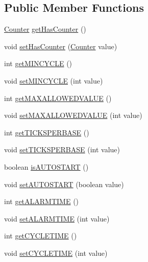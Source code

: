 \subsection*{Public Member Functions}
\begin{DoxyCompactItemize}
\item 
\hyperlink{interfaceshootingmachineemfmodel_1_1_counter}{Counter} \hyperlink{interfaceshootingmachineemfmodel_1_1_alarm_a442e899482a13941a48d3921b5892265}{get\-Has\-Counter} ()
\item 
void \hyperlink{interfaceshootingmachineemfmodel_1_1_alarm_a3314858d4d4a081da9b50bf279d7851f}{set\-Has\-Counter} (\hyperlink{interfaceshootingmachineemfmodel_1_1_counter}{Counter} value)
\item 
int \hyperlink{interfaceshootingmachineemfmodel_1_1_alarm_a0fbebe94ea5a08f4ad9bace4563bd149}{get\-M\-I\-N\-C\-Y\-C\-L\-E} ()
\item 
void \hyperlink{interfaceshootingmachineemfmodel_1_1_alarm_a7400566a915b403ceb7219ccd4a40f7c}{set\-M\-I\-N\-C\-Y\-C\-L\-E} (int value)
\item 
int \hyperlink{interfaceshootingmachineemfmodel_1_1_alarm_a63e36037c1877c380b5494f1a05dce5e}{get\-M\-A\-X\-A\-L\-L\-O\-W\-E\-D\-V\-A\-L\-U\-E} ()
\item 
void \hyperlink{interfaceshootingmachineemfmodel_1_1_alarm_aae7bb6babb30269f5a6e7c74db2a0471}{set\-M\-A\-X\-A\-L\-L\-O\-W\-E\-D\-V\-A\-L\-U\-E} (int value)
\item 
int \hyperlink{interfaceshootingmachineemfmodel_1_1_alarm_ada895bdbb794428a1f71ba70acaf7fa3}{get\-T\-I\-C\-K\-S\-P\-E\-R\-B\-A\-S\-E} ()
\item 
void \hyperlink{interfaceshootingmachineemfmodel_1_1_alarm_a1f9e751dd5f46578f54abd54aee555f8}{set\-T\-I\-C\-K\-S\-P\-E\-R\-B\-A\-S\-E} (int value)
\item 
boolean \hyperlink{interfaceshootingmachineemfmodel_1_1_alarm_a8c57a5583c781aa422d21e13be557d70}{is\-A\-U\-T\-O\-S\-T\-A\-R\-T} ()
\item 
void \hyperlink{interfaceshootingmachineemfmodel_1_1_alarm_a1f97de741bbb8ba21335c3c9db52721c}{set\-A\-U\-T\-O\-S\-T\-A\-R\-T} (boolean value)
\item 
int \hyperlink{interfaceshootingmachineemfmodel_1_1_alarm_a186180990a9c00307acdcd4d6dbf4c9e}{get\-A\-L\-A\-R\-M\-T\-I\-M\-E} ()
\item 
void \hyperlink{interfaceshootingmachineemfmodel_1_1_alarm_ad098d87bd6080719a7fa438f7d1ccb6f}{set\-A\-L\-A\-R\-M\-T\-I\-M\-E} (int value)
\item 
int \hyperlink{interfaceshootingmachineemfmodel_1_1_alarm_a11fdadcd243369f06f69c66230f1a831}{get\-C\-Y\-C\-L\-E\-T\-I\-M\-E} ()
\item 
void \hyperlink{interfaceshootingmachineemfmodel_1_1_alarm_a638312e8d84ee55345afe7f0883cdeb3}{set\-C\-Y\-C\-L\-E\-T\-I\-M\-E} (int value)
\end{DoxyCompactItemize}


